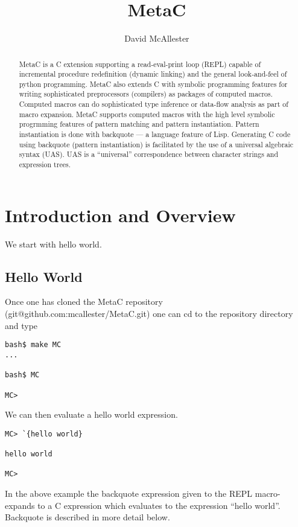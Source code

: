 \documentclass{article}
\title{MetaC}
\author{David McAllester}
\begin{document}
\maketitle

\begin{abstract}
MetaC is a C extension supporting a read-eval-print loop (REPL) capable of incremental procedure redefinition (dynamic linking) and the general look-and-feel of
python programming.  MetaC also extends C with symbolic programming features for writing sophisticated preprocessors (compilers) as packages of computed macros.
Computed macros can do
sophisticated type inference or data-flow analysis as part of macro expansion.  MetaC supports computed macros with the high level symbolic progrmming features
of pattern matching and pattern instantiation.  Pattern instantiation is done with backquote --- a language feature of Lisp.
Generating C code using backquote (pattern instantiation) is facilitated by the use of a universal algebraic syntax (UAS).  UAS is a ``universal''
correspondence between character strings and expression trees.
\end{abstract}

\section{Introduction and Overview}

We start with hello world.

\subsection{Hello World}

Once one has cloned the MetaC repository (git@github.com:mcallester/MetaC.git) one can cd to the repository directory and type 

\begin{verbatim}
bash$ make MC
...

bash$ MC

MC>
\end{verbatim}

We can then evaluate a hello world expression.

\begin{verbatim}
MC> `{hello world}

hello world

MC>
\end{verbatim}

In the above example the backquote expression given to the REPL macro-expands to a C expression which evaluates to the expression ``hello world''.
Backquote is described in more detail below.
\end{document}
